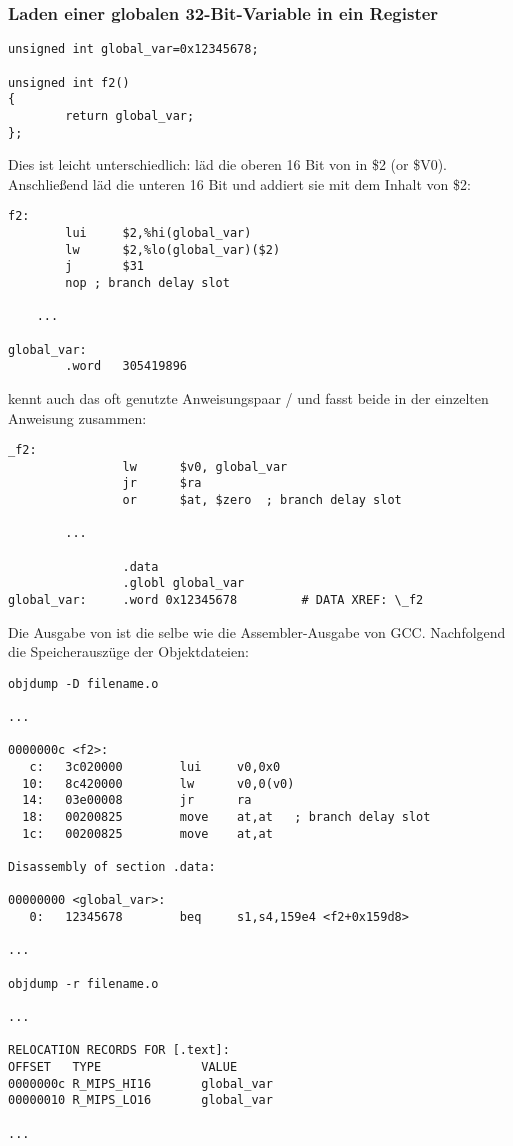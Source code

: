 \subsubsection{Laden einer globalen 32-Bit-Variable in ein Register}

\begin{lstlisting}[style=customc]
unsigned int global_var=0x12345678;

unsigned int f2()
{
        return global_var;
};
\end{lstlisting}


Dies ist leicht unterschiedlich:  läd die oberen 16 Bit von 
in \$2 (or \$V0). Anschließend läd  die unteren 16 Bit und addiert sie mit
dem Inhalt von \$2:

\begin{lstlisting}[caption=GCC 4.4.5 -O3 (\assemblyOutput),style=customasmMIPS]
f2:
        lui     $2,%hi(global_var)
        lw      $2,%lo(global_var)($2)
        j       $31
        nop	; branch delay slot

	...

global_var:
        .word   305419896
\end{lstlisting}

\IDA kennt auch das oft genutzte Anweisungspaar / und fasst beide
in der einzelten Anweisung  zusammen:

\begin{lstlisting}[caption=GCC 4.4.5 -O3 (IDA),style=customasmMIPS]
_f2:
                lw      $v0, global_var
                jr      $ra
                or      $at, $zero	; branch delay slot

		...

                .data
                .globl global_var
global_var:     .word 0x12345678         # DATA XREF: \_f2
\end{lstlisting}

Die Ausgabe von  ist die selbe wie die Assembler-Ausgabe von GCC.
Nachfolgend die Speicherauszüge der Objektdateien:

\begin{lstlisting}[caption=objdump,style=customasmMIPS]
objdump -D filename.o

...

0000000c <f2>:
   c:   3c020000        lui     v0,0x0
  10:   8c420000        lw      v0,0(v0)
  14:   03e00008        jr      ra
  18:   00200825        move    at,at	; branch delay slot
  1c:   00200825        move    at,at

Disassembly of section .data:

00000000 <global_var>:
   0:   12345678        beq     s1,s4,159e4 <f2+0x159d8>

...

objdump -r filename.o

...

RELOCATION RECORDS FOR [.text]:
OFFSET   TYPE              VALUE
0000000c R_MIPS_HI16       global_var
00000010 R_MIPS_LO16       global_var

...

\end{lstlisting}

